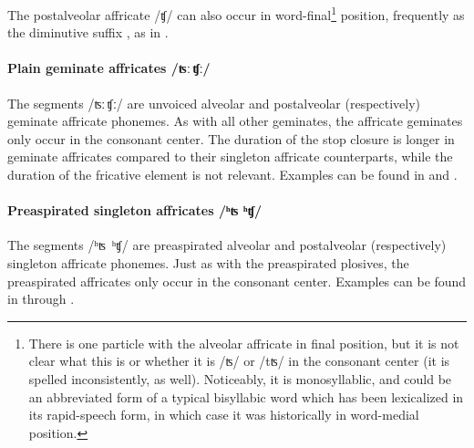 The postalveolar affricate /ʧ/ can also occur in word-final\footnote{There is one particle  with the alveolar affricate in final position, but it is not clear what this is or whether it is /ʦ/ or /tʦ/ in the consonant center (it is spelled inconsistently, as well). Noticeably, it is monosyllablic, and could be an abbreviated form of a typical bisyllabic word which has been lexicalized in its rapid-speech form, in which case it was historically in word-medial position.} %
position, frequently as the diminutive suffix , as in .

\paragraph{Plain geminate affricates /ʦː\,ʧː/}
The segments /ʦː\,ʧː/ are unvoiced alveolar and postalveolar (respectively) geminate affricate phonemes. As with all other geminates, the affricate geminates only occur in the consonant center. The duration of the stop closure is longer in geminate affricates compared to their singleton affricate counterparts, while the duration of the fricative element is not relevant.
Examples can be found in  and .

\paragraph{Preaspirated singleton affricates /ʰʦ ʰʧ/}
The segments \mbox{/ʰʦ ʰʧ/} are preaspirated alveolar and postalveolar (respectively) singleton affricate phonemes. Just as with the preaspirated plosives, the preaspirated affricates only occur in the consonant center. Examples can be found in  through .


